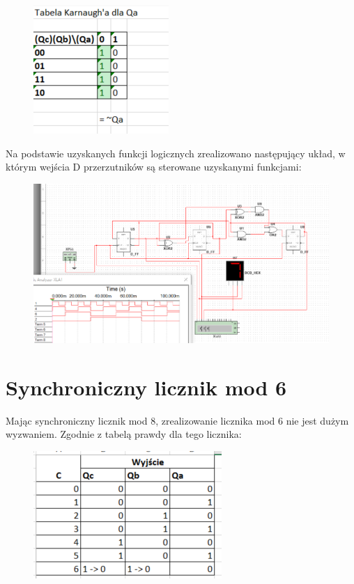 \documentclass[12pt,a4paper]{article}
\begin{document}
\begin{figure}[H]
\centering
\includegraphics{img/4c_table_qa}
\end{figure}

Na podstawie uzyskanych funkcji logicznych zrealizowano następujący układ, w którym wejścia D przerzutników są sterowane uzyskanymi funkcjami:


\begin{figure}[H]
\centering
\includegraphics[width=\textwidth]{img/4c}
\end{figure}

\section{Synchroniczny licznik mod 6}
Mając synchroniczny licznik mod 8, zrealizowanie licznika mod 6 nie jest dużym wyzwaniem. Zgodnie z tabelą prawdy dla tego licznika:

\begin{figure}[H]
\centering
\includegraphics{img/4d_table}
\end{figure}
\end{document}
